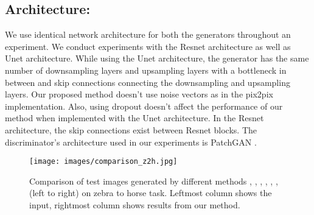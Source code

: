 \documentclass[a4paper,twoside]{article}
\begin{document}
\subsection{Architecture:}
\label{Architecture}
\noindent
We use identical network architecture for both the generators throughout an experiment. We conduct experiments with the Resnet \cite{Zhang2015Resnet} architecture as well as Unet \cite{Unet_RonnebergerFB15} architecture. While using the Unet architecture, the generator has the same number of downsampling layers and upsampling layers with a bottleneck in between and skip connections connecting the downsampling and upsampling layers. Our proposed method doesn't use noise vectors as in the pix2pix implementation\cite{pix2pix_isola2017}. Also, using dropout doesn't affect the performance of our method when implemented with the Unet architecture. In the Resnet architecture, the skip connections exist between Resnet blocks. The discriminator's architecture used in our experiments is PatchGAN \cite{CycleGAN2017}. 
\begin{table}[!ht] \footnotesize
\centering
\caption{Effect of network architectures \cite{Unet_RonnebergerFB15} and \cite{Zhang2015Resnet} on translation tasks horse $\leftrightarrow$ zebra and apples $\leftrightarrow$ oranges. The results are compared using FID and KID scores.}
\label{tab: Comparison of Network Architectures}
\end{table}
\begin{figure}[!ht] \small
\centering
\texttt{[image: images/comparison\_z2h.jpg]}
\caption{Comparison of test images generated by different methods \cite{CycleGAN2017}, \cite{Residual-Attention_WangJQYLZWT17}, \cite{DiscoGAN_KimCKLK17}, \cite{UNIT_LiuBK17}, \cite{DualGAN_YiZTG17}, \cite{Mejjati2018UAIT}, \cite{attentionGAN} (left to right) on zebra to horse task. Leftmost column shows the input, rightmost column shows results from our method.
}
\label{img:Comparison zebra to horse}
\end{figure}
\end{document}
